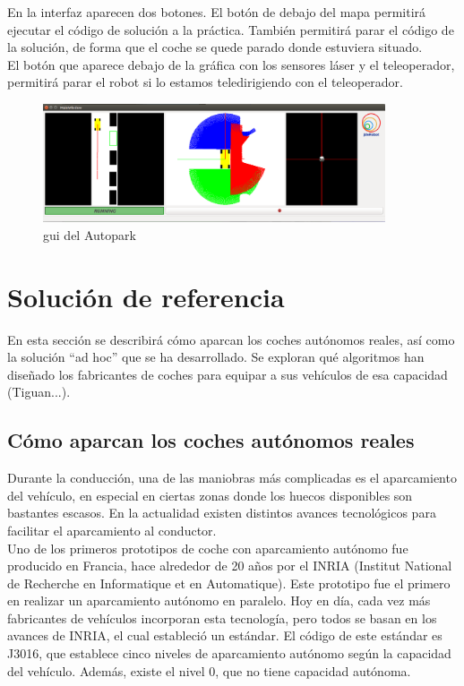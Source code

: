 En la interfaz aparecen dos botones. El botón de debajo del mapa permitirá ejecutar el código de solución a la práctica. También permitirá parar el código de la solución, de forma que el coche se quede parado donde estuviera situado.\\

El botón que aparece debajo de la gráfica con los sensores láser y el teleoperador, permitirá parar el robot si lo estamos teledirigiendo con el teleoperador. \\

\begin{figure}[H]
  \begin{center}
    \includegraphics[width=0.9\textwidth]{figures/Autopark/GUI_Autopark.png}
		\caption{\acrshort{gui} del Autopark}
		\label{fig.GUI_Autopark}
		\end{center}
\end{figure}

\section{Solución de referencia}
En esta sección se describirá cómo aparcan los coches autónomos reales, así como la solución ``ad hoc'' que se ha desarrollado. Se exploran qué algoritmos han diseñado los fabricantes de coches para equipar a sus vehículos de esa capacidad (Tiguan...).

\subsection{Cómo aparcan los coches autónomos reales}
Durante la conducción, una de las maniobras más complicadas es el aparcamiento del vehículo, en especial en ciertas zonas donde los huecos disponibles son bastantes escasos. En la actualidad existen distintos avances tecnológicos para facilitar el aparcamiento al conductor.\\


Uno de los primeros prototipos de coche con aparcamiento autónomo fue producido en Francia, hace alrededor de 20 años por el INRIA (Institut National de Recherche en Informatique et en Automatique). Este prototipo fue el primero en realizar un aparcamiento autónomo en paralelo. Hoy en día, cada vez más fabricantes de vehículos incorporan esta tecnología, pero todos se basan en los avances de INRIA, el cual estableció un estándar. El código de este estándar es J3016, que establece cinco niveles de aparcamiento autónomo según la capacidad del vehículo. Además, existe el nivel 0, que no tiene capacidad autónoma.

